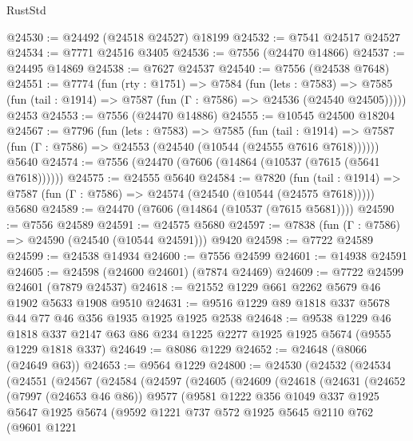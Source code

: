 \begin{lexlean}{RustStd}
\begin{coremodule}
{\begin{coremodule}
{{{{{{{{{{{{{{{{{{{{{{{{{{{{{{{{{{{{{{{{{{{@24530 := @24492 (@24518 @24527) @18199
@24532 := @7541 @24517 @24527
@24534 := @7771 @24516 @3405
@24536 := @7556 (@24470 @14866)
@24537 := @24495 @14869
@24538 := @7627 @24537
@24540 := @7556 (@24538 @7648)
@24551 := @7774
    (fun (rty : @1751) =>
    @7584
      (fun (lets : @7583) =>
      @7585 (fun (tail : @1914) => @7587 (fun (Γ : @7586) => @24536 (@24540 @24505)))))
    @2453
@24553 := @7556 (@24470 @14886)
@24555 := @10545 @24500 @18204
@24567 := @7796
    (fun (lets : @7583) =>
    @7585
      (fun (tail : @1914) =>
      @7587 (fun (Γ : @7586) => @24553 (@24540 (@10544 (@24555 @7616 @7618))))))
    @5640
@24574 := @7556 (@24470 (@7606 (@14864 (@10537 (@7615 (@5641 @7618))))))
@24575 := @24555 @5640
@24584 := @7820
    (fun (tail : @1914) => @7587 (fun (Γ : @7586) => @24574 (@24540 (@10544 (@24575 @7618)))))
    @5680
@24589 := @24470 (@7606 (@14864 (@10537 (@7615 @5681))))
@24590 := @7556 @24589
@24591 := @24575 @5680
@24597 := @7838 (fun (Γ : @7586) => @24590 (@24540 (@10544 @24591))) @9420
@24598 := @7722 @24589
@24599 := @24538 @14934
@24600 := @7556 @24599
@24601 := @14938 @24591
@24605 := @24598 (@24600 @24601) (@7874 @24469)
@24609 := @7722 @24599 @24601 (@7879 @24537)
@24618 := @21552 @1229 @661 @2262 @5679 @46 @1902 @5633 @1908 @9510
@24631 := @9516 @1229 @89 @1818 @337 @5678 @44 @77 @46 @356 @1935 @1925 @1925 @2538
@24648 := @9538
    @1229
    @46
    @1818
    @337
    @2147
    @63
    @86
    @234
    @1225
    @2277
    @1925
    @1925
    @5674
    (@9555 @1229 @1818 @337)
@24649 := @8086 @1229
@24652 := @24648 (@8066 (@24649 @63))
@24653 := @9564 @1229
@24800 := @24530
    (@24532
      (@24534
        (@24551
          (@24567
            (@24584
              (@24597
                (@24605
                  (@24609
                    (@24618
                      (@24631
                        (@24652
                          (@7997 (@24653 @46 @86))
                          @9577
                          (@9581
                            @1222
                            @356
                            @1049
                            @337
                            @1925
                            @5647
                            @1925
                            @5674
                            (@9592
                              @1221
                              @737
                              @572
                              @1925
                              @5645
                              @2110
                              @762
                              (@9601
                                @1221
}}}}}}}}}}}}}}}}}}}}}}}}}}}}}}}}}}}}}}}}}}}
\end{coremodule}}
\end{coremodule}
\end{lexlean}
